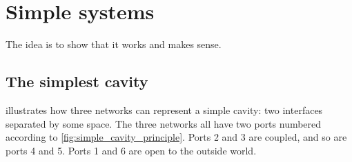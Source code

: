 
\section{Simple systems}
\label{sec:simple_systems}

The idea is to show that it works and makes sense.




\subsection{The simplest cavity}
\label{sec:the_simplest_cavity}

 illustrates how three networks can represent a simple cavity: two interfaces separated by some space.
The three networks all have two ports numbered according to \cref{fig:simple_cavity_principle}.
Ports 2 and 3 are coupled, and so are ports 4 and 5.
Ports 1 and 6 are open to the outside world.

